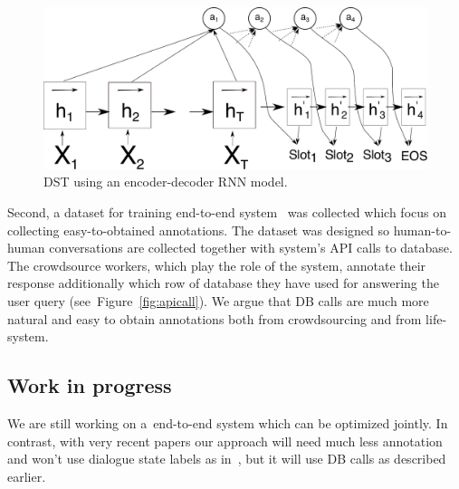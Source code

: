 \documentclass[11pt]{article}
\begin{document}
\begin{figure}[htb]
    \centering
    \includegraphics[width=1.0\linewidth]{dst_seq2seq}
    \caption{DST using an encoder-decoder RNN model.}
\label{fig:dst_seq2seq}
\end{figure}

Second, a dataset for training end-to-end system~\cite{platek2016wochat} was collected which focus on collecting easy-to-obtained annotations.
The dataset was designed so human-to-human conversations are collected together with system's API calls to database.
The crowdsource workers, which play the role of the system, annotate their response additionally which row of database they have used for answering the user query (see~Figure~\ref{fig:apicall}).
We argue that DB calls are much more natural and easy to obtain annotations both from crowdsourcing and from life-system. 

\subsection{Work in progress}\label{sec:wip}

We are still working on a~end-to-end system which can be optimized jointly.
In contrast, with very recent papers our approach will need much less annotation and won't use dialogue state labels as in~\cite{wen_networkbased_2016}, but it will use DB calls as described earlier.
\end{document}
